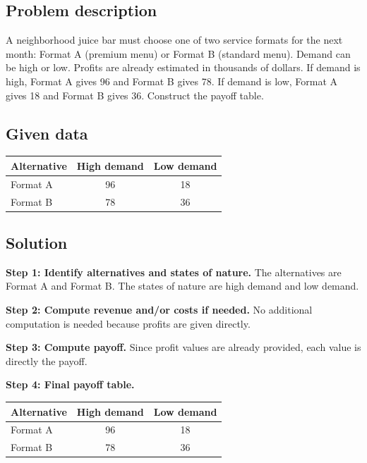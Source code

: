 

	
	\begin{ExamProblems}
		\item
		\subsection*{Problem description}
		A neighborhood juice bar must choose one of two service formats for the next month: Format A (premium menu)
		or Format B (standard menu). Demand can be high or low. Profits are already estimated in thousands of dollars.
		If demand is high, Format A gives 96 and Format B gives 78. If demand is low, Format A gives 18 and Format B gives 36.
		Construct the payoff table.
		
		\subsection*{Given data}
		\begin{center}
			\begin{tabular}{l c c}
				\toprule
				Alternative & High demand & Low demand \\
				\midrule
				Format A & 96 & 18 \\
				Format B & 78 & 36 \\
				\bottomrule
			\end{tabular}
		\end{center}
		
		\subsection*{Solution}
		\textbf{Step 1: Identify alternatives and states of nature.} The alternatives are Format A and Format B. The states of nature are high demand and low demand.
		
		\textbf{Step 2: Compute revenue and/or costs if needed.} No additional computation is needed because profits are given directly.
		
		\textbf{Step 3: Compute payoff.} Since profit values are already provided, each value is directly the payoff.
		
		\textbf{Step 4: Final payoff table.}
		\begin{center}
			\begin{tabular}{l c c}
				\toprule
				Alternative & High demand & Low demand \\
				\midrule
				Format A & 96 & 18 \\
				Format B & 78 & 36 \\
				\bottomrule
			\end{tabular}
		\end{center}
		

\end{ExamProblems}
